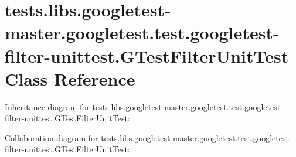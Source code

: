 \hypertarget{classtests_1_1libs_1_1googletest-master_1_1googletest_1_1test_1_1googletest-filter-unittest_1_1GTestFilterUnitTest}{}\section{tests.\+libs.\+googletest-\/master.googletest.\+test.\+googletest-\/filter-\/unittest.G\+Test\+Filter\+Unit\+Test Class Reference}
\label{classtests_1_1libs_1_1googletest-master_1_1googletest_1_1test_1_1googletest-filter-unittest_1_1GTestFilterUnitTest}


Inheritance diagram for tests.\+libs.\+googletest-\/master.googletest.\+test.\+googletest-\/filter-\/unittest.G\+Test\+Filter\+Unit\+Test\+:


Collaboration diagram for tests.\+libs.\+googletest-\/master.googletest.\+test.\+googletest-\/filter-\/unittest.G\+Test\+Filter\+Unit\+Test\+:
